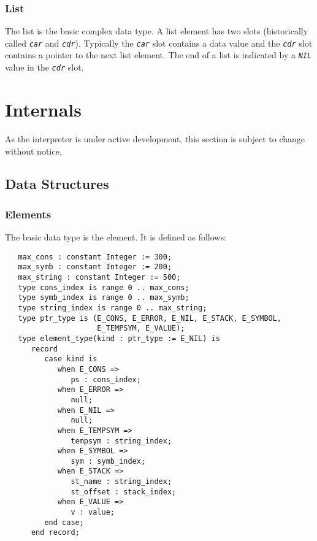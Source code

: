 \documentclass[10pt, openany]{book}
\newcommand{\constant}[1]{\emph{\texttt{#1}}}
\begin{document}
\subsection{List}
The list is the basic complex data type.  A list element has two slots (historically called \constant{car} and \constant{cdr}).  Typically the \constant{car} slot contains a data value and the \constant{cdr} slot contains a pointer to the next list element.  The end of a list is indicated by a \constant{NIL} value in the \constant{cdr} slot.

\chapter{Internals}
As the interpreter is under active development, this section is subject to change without notice.

\section{Data Structures}

\subsection{Elements}
The basic data type is the element.  It is defined as follows:
\lstset{language=Ada}
\begin{lstlisting}
   max_cons : constant Integer := 300;
   max_symb : constant Integer := 200;
   max_string : constant Integer := 500;
   type cons_index is range 0 .. max_cons;
   type symb_index is range 0 .. max_symb;
   type string_index is range 0 .. max_string;
   type ptr_type is (E_CONS, E_ERROR, E_NIL, E_STACK, E_SYMBOL,
                     E_TEMPSYM, E_VALUE);
   type element_type(kind : ptr_type := E_NIL) is
      record
         case kind is
            when E_CONS =>
               ps : cons_index;
            when E_ERROR =>
               null;
            when E_NIL =>
               null;
            when E_TEMPSYM =>
               tempsym : string_index;
            when E_SYMBOL =>
               sym : symb_index;
            when E_STACK =>
               st_name : string_index;
               st_offset : stack_index;
            when E_VALUE =>
               v : value;
         end case;
      end record;
\end{lstlisting}
\end{document}
